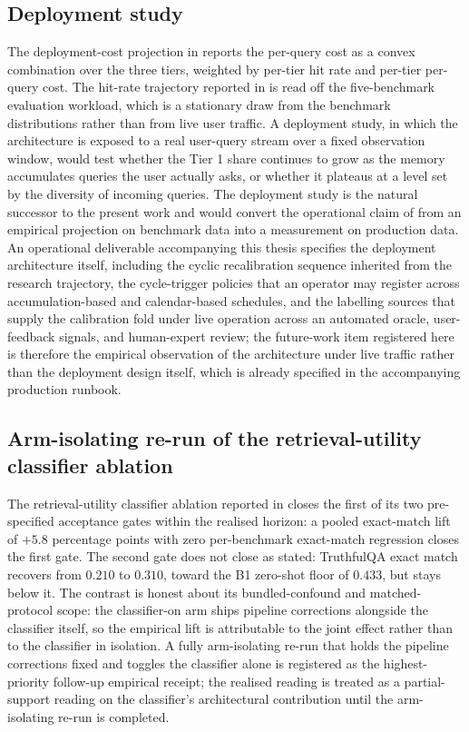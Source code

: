 \subsection{Deployment study}
\label{sec:future-deployment}

The deployment-cost projection in  reports the per-query cost as a convex combination over the three tiers, weighted by per-tier hit rate and per-tier per-query cost. The hit-rate trajectory reported in  is read off the five-benchmark evaluation workload, which is a stationary draw from the benchmark distributions rather than from live user traffic. A deployment study, in which the architecture is exposed to a real user-query stream over a fixed observation window, would test whether the Tier 1 share continues to grow as the memory accumulates queries the user actually asks, or whether it plateaus at a level set by the diversity of incoming queries. The deployment study is the natural successor to the present work and would convert the operational claim of  from an empirical projection on benchmark data into a measurement on production data. An operational deliverable accompanying this thesis specifies the deployment architecture itself, including the cyclic recalibration sequence inherited from the research trajectory, the cycle-trigger policies that an operator may register across accumulation-based and calendar-based schedules, and the labelling sources that supply the calibration fold under live operation across an automated oracle, user-feedback signals, and human-expert review; the future-work item registered here is therefore the empirical observation of the architecture under live traffic rather than the deployment design itself, which is already specified in the accompanying production runbook.

\subsection{Arm-isolating re-run of the retrieval-utility classifier ablation}
\label{sec:future-ablations}

The retrieval-utility classifier ablation reported in  closes the first of its two pre-specified acceptance gates within the realised horizon: a pooled exact-match lift of $+5.8$ percentage points with zero per-benchmark exact-match regression closes the first gate. The second gate does not close as stated: TruthfulQA exact match recovers from $0.210$ to $0.310$, toward the B1 zero-shot floor of $0.433$, but stays below it. The contrast is honest about its bundled-confound and matched-protocol scope: the classifier-on arm ships pipeline corrections alongside the classifier itself, so the empirical lift is attributable to the joint effect rather than to the classifier in isolation. A fully arm-isolating re-run that holds the pipeline corrections fixed and toggles the classifier alone is registered as the highest-priority follow-up empirical receipt; the realised reading is treated as a partial-support reading on the classifier's architectural contribution until the arm-isolating re-run is completed.

